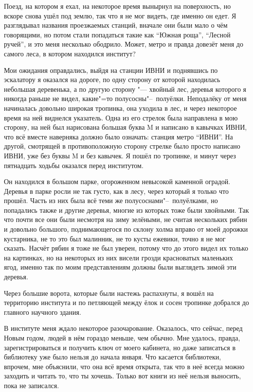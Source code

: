 Поезд, на котором я ехал, на некоторое время вынырнул на поверхность, но вскоре
снова ушёл под землю, так что я не мог видеть, где именно он едет.
Я разглядывал названия проезжаемых станций, вначале они были мало о чём
говорящими, но потом стали попадаться такие как \enquote{Южная роща},
\enquote{Лесной ручей}, и это меня несколько ободрило.
Может, метро и правда довезёт меня до самого леса, в котором находился институт?

Мои ожидания оправдались, выйдя на станции ИВНИ и поднявшись по эскалатору я
оказался на дороге, по одну сторону от которой находилась небольшая деревенька,
а по другую сторону "--- хвойный лес, деревья которого я никогда раньше не
видел, какие"=то полусосны"--~полуёлки.
Неподалёку от меня начиналась довольно широкая тропинка, она уходила в лес, и
через некоторое время на ней виднелся указатель.
Одна из его стрелок была направлена в мою сторону, на ней был нарисована большая
буква M и написано в кавычках ИВНИ, что всё вместе наверняка должно было
означать: станция метро \enquote{ИВНИ}.
На другой, смотрящей в противоположную сторону стрелке было просто написано
ИВНИ, уже без буквы M и без кавычек.
Я пошёл по тропинке, и минут через пятнадцать ходьбы оказался перед институтом.

Он находился в большом парке, огороженном невысокой каменной оградой.
Деревья в парке росли не так густо, как в лесу, через который я только что
прошёл.
Часть из них была всё теми же полусоснами"--~полуёлками, но попадались также и
другие деревья, многие из которых тоже были хвойными.
Так что почти все они были несмотря на зиму зелёными, не считая нескольких рябин
и довольно большого, поднимающегося по склону холма вправо от моей дорожки
кустарника, не то это был малинник, не то кусты ежевики, точно я не мог сказать.
Насчёт рябин я тоже не был уверен, потому что до этого видел их только на
картинках, но на некоторых из них висели грозди красноватых маленьких ягод,
именно так по моим представлениям должны были выглядеть зимой эти деревья.

Через большие ворота, которые были настежь распахнуты, я вошёл на территорию
института и по петляющей между ёлок и сосен тропинке добрался до главного
научного здания.

В институте меня ждало некоторое разочарование.
Оказалось, что сейчас, перед Новым годом, людей в нём гораздо меньше, чем
обычно.
Мне удалось, правда, зарегистрироваться и получить ключ от моего кабинета, но
даже записаться в библиотеку уже было нельзя до начала января.
Что касается библиотеки, впрочем, мне объяснили, что она всё время открыта, так
что в неё всегда можно заходить и читать то, что ты хочешь.
Только вот книги из неё нельзя выносить, пока не записался.

